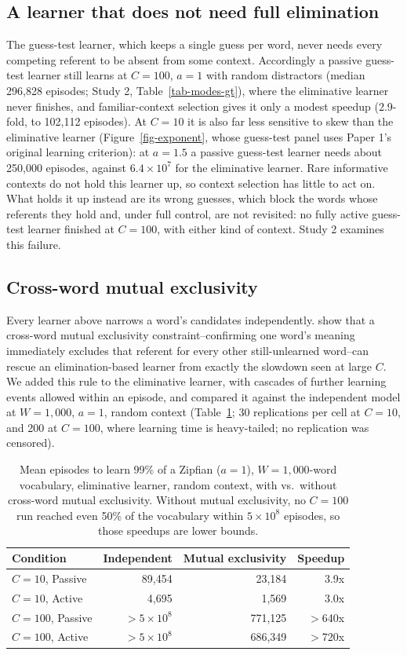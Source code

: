 \documentclass[a4paper,natbib,man]{apa6}
\begin{document}
\subsection{A learner that does not need full elimination}
The guess-test learner, which keeps a single guess per word, never needs every competing referent to be absent from some context. Accordingly a passive guess-test learner still learns at $C=100$, $a=1$ with random distractors (median 296,828 episodes; Study 2, Table~\ref{tab-modes-gt}), where the eliminative learner never finishes, and familiar-context selection gives it only a modest speedup (2.9-fold, to 102,112 episodes). At $C=10$ it is also far less sensitive to skew than the eliminative learner (Figure~\ref{fig-exponent}, whose guess-test panel uses Paper 1's original learning criterion): at $a=1.5$ a passive guess-test learner needs about 250,000 episodes, against $6.4 \times 10^7$ for the eliminative learner. Rare informative contexts do not hold this learner up, so context selection has little to act on. What holds it up instead are its wrong guesses, which block the words whose referents they hold and, under full control, are not revisited: no fully active guess-test learner finished at $C=100$, with either kind of context. Study 2 examines this failure.

\subsection{Cross-word mutual exclusivity}
\label{sec-mutex}
Every learner above narrows a word's candidates independently. \cite{Reisenauer:2013} show that a cross-word mutual exclusivity constraint--confirming one word's meaning immediately excludes that referent for every other still-unlearned word--can rescue an elimination-based learner from exactly the slowdown seen at large $C$. We added this rule to the eliminative learner, with cascades of further learning events allowed within an episode, and compared it against the independent model at $W=1{,}000$, $a=1$, random context (Table~\ref{tab-mutex}; 30 replications per cell at $C=10$, and 200 at $C=100$, where learning time is heavy-tailed; no replication was censored).

\begin{table}[h]
\centering
\caption{\label{tab-mutex} Mean episodes to learn 99\% of a Zipfian ($a=1$), $W=1{,}000$-word vocabulary, eliminative learner, random context, with vs.\ without cross-word mutual exclusivity. Without mutual exclusivity, no $C=100$ run reached even 50\% of the vocabulary within $5 \times 10^8$ episodes, so those speedups are lower bounds.}
\begin{tabular}{lrrr}
\hline
Condition & Independent & Mutual exclusivity & Speedup \\
\hline
$C=10$, Passive & 89{,}454 & 23{,}184 & 3.9x \\
$C=10$, Active & 4{,}695 & 1{,}569 & 3.0x \\
$C=100$, Passive & $>5 \times 10^8$ & 771{,}125 & $>$640x \\
$C=100$, Active & $>5 \times 10^8$ & 686{,}349 & $>$720x \\
\hline
\end{tabular}
\end{table}
\end{document}
